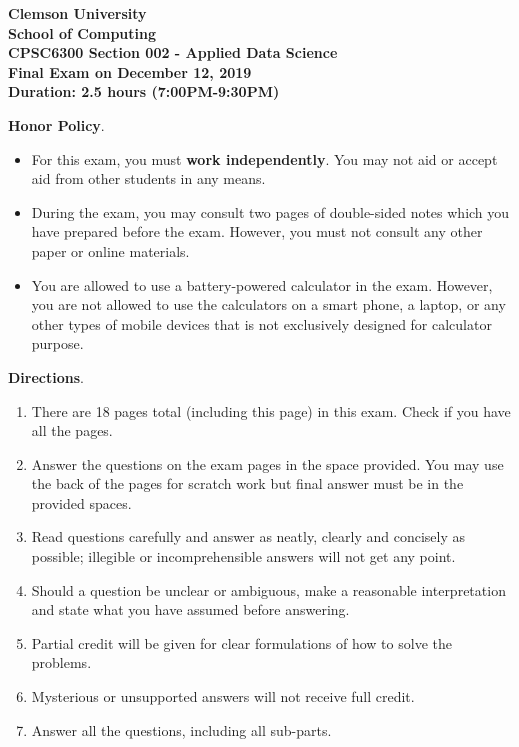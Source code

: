 \documentclass[addpoints,11pt]{exam}
\begin{document}
\begin{coverpages}

\begin{center}
  \textbf{\large{
  Clemson University\\
  School of Computing\\
  CPSC6300 Section 002 - Applied Data Science\\
  Final Exam on December 12, 2019\\
  Duration: 2.5 hours (7:00PM-9:30PM)}}
\end{center}


\textbf{Honor Policy}.

\begin{itemize}
  \item For this exam, you must \textbf{work independently}. You may not aid or accept aid from other students in any means.
  \item During the exam, you may consult two pages of double-sided notes which you have prepared before the exam. However, you must not consult any other paper or online materials.
  \item You are allowed to use a battery-powered calculator in the exam. However, you are not allowed to use the calculators on a smart phone, a laptop, or any other types of mobile devices that is not exclusively designed for calculator purpose.
\end{itemize}

\textbf{Directions}.

\begin{enumerate}
  \item There are 18 pages total (including this page) in this exam. Check if you have all the pages.
  \item Answer the questions on the exam pages in the space provided. You may use the back of the pages for scratch work but final answer must be in the provided spaces.
  \item Read questions carefully and answer as neatly, clearly and concisely as possible; illegible or incomprehensible answers will not get any point.
  \item Should a question be unclear or ambiguous, make a reasonable interpretation and state what you have assumed before answering.
  \item Partial credit will be given for clear formulations of how to solve the problems.
  \item Mysterious or unsupported answers will not receive full credit.
  \item Answer all the questions, including all sub-parts.
\end{enumerate}
\vspace{0.1in}


\end{coverpages}
\end{document}
